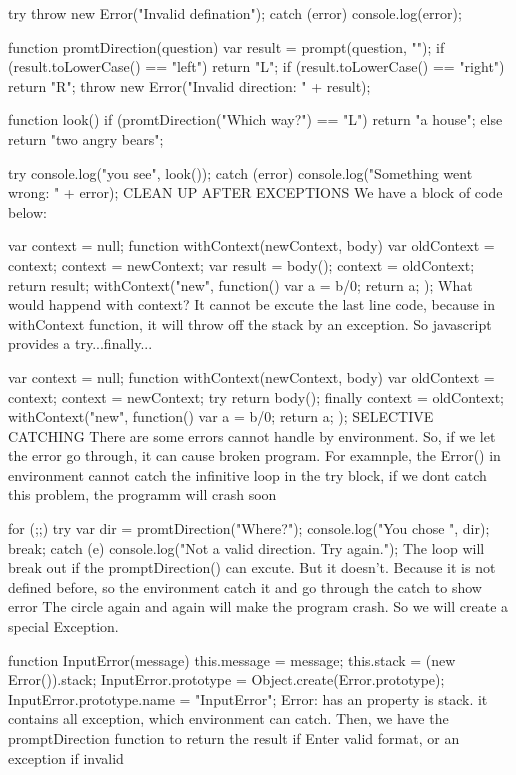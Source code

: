 try {
    throw new Error("Invalid defination");
} catch (error){
    console.log(error);
}

function promtDirection(question){
    var result = prompt(question, "");
    if (result.toLowerCase() == "left") return "L";
    if (result.toLowerCase() == "right") return "R";
    throw new Error("Invalid direction: " + result);
}

function look(){
    if (promtDirection("Which way?") == "L") {
        return "a house";
    }
    else{
        return "two angry bears";
    }
}

try {
    console.log("you see", look());
} catch (error) {
    console.log("Something went wrong: " + error);
}
CLEAN UP AFTER EXCEPTIONS
We have a block of code below:

var context = null;
function withContext(newContext, body){
  var oldContext = context;
  context = newContext;
  var result = body();
  context = oldContext;
  return result;
}
withContext("new", function(){
  var a = b/0;
  return a;
});
What would happend with context? It cannot be excute the last line code, because in withContext function, it will throw off the stack by an exception. So javascript provides a try...finally...

var context = null;
function withContext(newContext, body){
  var oldContext = context;
  context = newContext;
  try{
    return body();
  } finally {
    context = oldContext;
  }
}
withContext("new", function(){
  var a = b/0;
  return a;
});
SELECTIVE CATCHING
There are some errors cannot handle by environment. So, if we let the error go through, it can cause broken program.
For examnple, the Error() in environment cannot catch the infinitive loop in the try block, if we dont catch this problem, the programm will crash soon

for (;;) {
  try {
    var dir = promtDirection("Where?");
    console.log("You chose ", dir);
    break;
  } catch (e) {
    console.log("Not a valid direction. Try again.");
  }
}
The loop will break out if the promptDirection() can excute.
But it doesn't. Because it is not defined before, so the environment catch it and go through the catch to show error
The circle again and again will make the program crash.
So we will create a special Exception.

function InputError(message){
  this.message = message;
  this.stack = (new Error()).stack;
}
InputError.prototype = Object.create(Error.prototype);
InputError.prototype.name = "InputError";
Error: has an property is stack. it contains all exception, which environment can catch. Then, we have the promptDirection function to return the result if Enter valid format, or an exception if invalid

